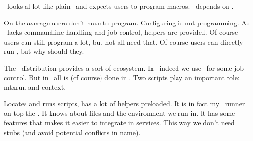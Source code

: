 
\startdocument
  [title=The scripts,
   color=darkblue]

\StartSteps

\startsubject[title=Some myths]

    \startitemize[packed]

        \startitem \CONTEXT\ looks al lot like plain \TEX\ and expects users to program macros. \stopitem \FlushStep
        \startitem \CONTEXT\ depends on \RUBY. \stopitem \FlushStep

    \stopitemize

\stopsubject

\startsubject[title=The truth]

    \startitemize[packed]

        \startitem On the average users don't have to program. Configuring is not programming. \stopitem \FlushStep
        \startitem As \TEX\ lacks commandline handling and job control, helpers are provided. \stopitem \FlushStep
        \startitem Of course users can still program a lot, but not all need that. \stopitem \FlushStep
        \startitem Of course users can directly run \CONTEXT, but why should they. \stopitem \FlushStep

    \stopitemize

\stopsubject

\startsubject[title=A few facts]

    \startitemize[packed]

        \startitem The \CONTEXT\ distribution provides a sort of ecosystem. \stopitem \FlushStep
        \startitem In \MKII\ indeed we use \RUBY\ for some job control. \stopitem \FlushStep
        \startitem But in \MKIV\ all is (of course) done in \LUA. \stopitem \FlushStep
        \startitem Two scripts play an important role: mtxrun and context. \stopitem \FlushStep

    \stopitemize

\stopsubject

\StopSteps

\page

\StartSteps

\startsubject[title=The \quote {mtxrun} script]

    \startitemize[packed]

        \startitem Locates and runs scripts, has a lot of helpers preloaded. \stopitem \FlushStep
        \startitem It is in fact my \LUA\ runner on top the \TEXLUA. \stopitem \FlushStep
        \startitem It knows about files and the environment we run in. \stopitem \FlushStep
        \startitem It has some features that makes it easier to integrate in services. \stopitem \FlushStep
        \startitem This way we don't need stubs (and avoid potential conflicts in name). \stopitem \FlushStep

